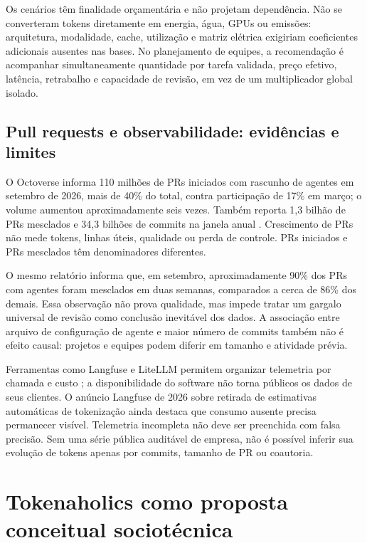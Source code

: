 \documentclass[11pt,a4paper]{article}
\begin{document}
Os cenários têm finalidade orçamentária e não projetam dependência. Não se converteram tokens diretamente em energia, água, GPUs ou emissões: arquitetura, modalidade, cache, utilização e matriz elétrica exigiriam coeficientes adicionais ausentes nas bases. No planejamento de equipes, a recomendação é acompanhar simultaneamente quantidade por tarefa validada, preço efetivo, latência, retrabalho e capacidade de revisão, em vez de um multiplicador global isolado.

\subsection{Pull requests e observabilidade: evidências e limites}
O Octoverse informa 110 milhões de PRs iniciados com rascunho de agentes em setembro de 2026, mais de 40\% do total, contra participação de 17\% em março; o volume aumentou aproximadamente seis vezes. Também reporta 1,3 bilhão de PRs mesclados e 34,3 bilhões de commits na janela anual \cite{github2026}. Crescimento de PRs não mede tokens, linhas úteis, qualidade ou perda de controle. PRs iniciados e PRs mesclados têm denominadores diferentes.

O mesmo relatório informa que, em setembro, aproximadamente 90\% dos PRs com agentes foram mesclados em duas semanas, comparados a cerca de 86\% dos demais. Essa observação não prova qualidade, mas impede tratar um gargalo universal de revisão como conclusão inevitável dos dados. A associação entre arquivo de configuração de agente e maior número de commits também não é efeito causal: projetos e equipes podem diferir em tamanho e atividade prévia.

Ferramentas como Langfuse e LiteLLM permitem organizar telemetria por chamada e custo \cite{langfuse2026,litellm2026}; a disponibilidade do software não torna públicos os dados de seus clientes. O anúncio Langfuse de 2026 sobre retirada de estimativas automáticas de tokenização ainda destaca que consumo ausente precisa permanecer visível. Telemetria incompleta não deve ser preenchida com falsa precisão. Sem uma série pública auditável de empresa, não é possível inferir sua evolução de tokens apenas por commits, tamanho de PR ou coautoria.

\section{Tokenaholics como proposta conceitual sociotécnica}
\end{document}
